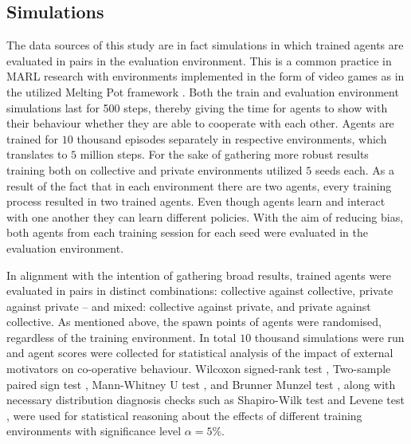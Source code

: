 \documentclass[pdflatex,sn-basic,lineno]{sn-jnl}
\theoremstyle{thmstyleone}%
\theoremstyle{thmstyletwo}%
\theoremstyle{thmstylethree}%
\begin{document}
\subsection{Simulations}\label{subsec4-1}

The data sources of this study are in fact simulations in which trained agents are evaluated in pairs in the evaluation
environment. This is a common practice in MARL research with environments implemented in the form of video games as in
the utilized Melting Pot framework \citep{Leibo2021, agapiou2023meltingpot20}. Both the train and evaluation environment
simulations last for 500 steps, thereby giving the time for agents to show with their behaviour whether they are able to
cooperate with each other. Agents are trained for $10$ thousand episodes separately in respective environments, which
translates to $5$ million steps. For the sake of gathering more robust results training both on collective and private
environments utilized $5$ seeds each. As a result of the fact that in each environment there are two agents, every
training process resulted in two trained
agents. Even though agents learn and interact with one another they can learn different policies. With the
aim of reducing bias, both agents from each training session for each seed were evaluated in the evaluation
environment.


In alignment with the intention of gathering broad results, trained agents were evaluated in pairs in distinct
combinations: collective against collective, private against private -- and mixed: collective against private, and
private against collective. As mentioned above, the spawn points of agents were randomised, regardless of the training
environment. In total $10$ thousand simulations were run and agent scores were collected for statistical analysis of the
impact of external motivators on co-operative behaviour. Wilcoxon signed-rank test \citep{Wilcoxon1945}, Two-sample
paired sign test \citep{Dixon1946}, Mann-Whitney U test \citep{Mann1947}, and Brunner Munzel test
\citep{Brunner2000}, along with necessary distribution diagnosis checks such as Shapiro-Wilk test \citep{Shapiro1965}
and Levene test \citep{levene1960}, were used for statistical reasoning about the effects of different training
environments with significance level $\alpha=5\%$.
\end{document}
